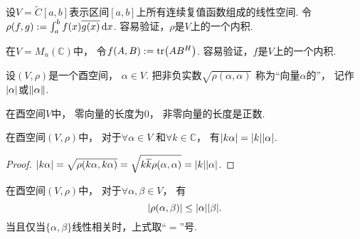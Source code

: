 \begin{example}
设\(V = \tilde{C}[a,b]\)表示区间\([a,b]\)上所有连续复值函数组成的线性空间.
令\(\rho(f,g) := \int_a^b f(x) \overline{g(x)} \dd{x}\).
容易验证，\(\rho\)是\(V\)上的一个内积.
\end{example}

\begin{example}
在\(V = M_n(\mathbb{C})\)中，
令\(f(A,B) := \tr(A B^H)\).
容易验证，\(f\)是\(V\)上的一个内积.
\end{example}

\begin{definition}
设\((V,\rho)\)是一个酉空间，
\(\alpha \in V\).
把非负实数\(\sqrt{\rho(\alpha,\alpha)}\)
称为“向量\(\alpha\)的”，
记作\(\abs{\alpha}\)或\(\norm{\alpha}\).
\end{definition}

\begin{property}\label{theorem:酉空间.向量的长度具有非负性}
在酉空间\(V\)中，
零向量的长度为\(0\)，
非零向量的长度是正数.
\end{property}

\begin{property}\label{theorem:酉空间.向量的长度具有齐次性}
在酉空间\((V,\rho)\)中，
对于\(\forall \alpha \in V\)
和\(\forall k \in \mathbb{C}\)，
有\(\abs{k\alpha} = \abs{k} \abs{\alpha}\).
\begin{proof}
\(\abs{k\alpha}
= \sqrt{\rho(k\alpha,k\alpha)}
= \sqrt{k \overline{k} \rho(\alpha,\alpha)}
= \abs{k} \abs{\alpha}\).
\end{proof}
\end{property}

\begin{theorem}
在酉空间\((V,\rho)\)中，
对于\(\forall \alpha,\beta \in V\)，
有\begin{equation}
	\abs{\rho(\alpha,\beta)} \leq \abs{\alpha} \abs{\beta}.
\end{equation}
当且仅当\(\{\alpha,\beta\}\)线性相关时，上式取“\(=\)”号.
\end{theorem}

